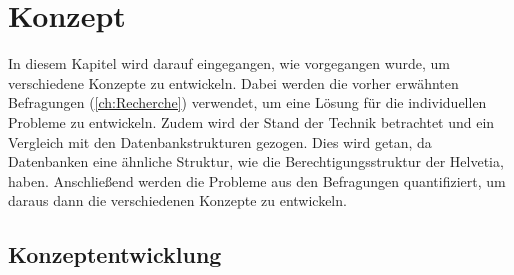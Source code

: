 \chapter{Konzept}
\label{ch:chapter04}
In diesem Kapitel wird darauf eingegangen, wie vorgegangen wurde, um verschiedene Konzepte zu entwickeln.
Dabei werden die vorher erwähnten Befragungen (\ref{ch:Recherche}) verwendet, um eine Lösung für die individuellen Probleme zu entwickeln.
Zudem wird der Stand der Technik betrachtet und ein Vergleich mit den Datenbankstrukturen gezogen.
Dies wird getan, da Datenbanken eine ähnliche Struktur, wie die Berechtigungsstruktur der Helvetia, haben. 
Anschließend werden die Probleme aus den Befragungen quantifiziert, um daraus dann die verschiedenen Konzepte zu entwickeln.


\section{Konzeptentwicklung}
\label{sec:chapter04:Konzeptentwicklung}

